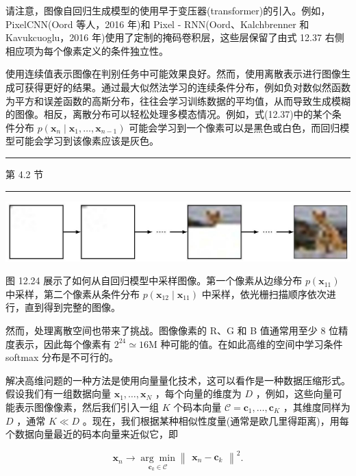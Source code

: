 \documentclass[10pt]{report}
\newcommand{\HRule}{\begin{center}\rule{0.9\linewidth}{0.2mm}\end{center}}
\begin{document}
请注意，图像自回归生成模型的使用早于变压器(transformer)的引入。例如，PixelCNN(Oord 等人，2016 年)和 Pixel - RNN(Oord、Kalchbrenner 和 Kavukcuoglu，2016 年)使用了定制的掩码卷积层，这些层保留了由式 12.37 右侧相应项为每个像素定义的条件独立性。

使用连续值表示图像在判别任务中可能效果良好。然而，使用离散表示进行图像生成可获得更好的结果。通过最大似然法学习的连续条件分布，例如负对数似然函数为平方和误差函数的高斯分布，往往会学习训练数据的平均值，从而导致生成模糊的图像。相反，离散分布可以轻松处理多模态情况。例如，式(12.37)中的某个条件分布 \(p\left( {{\mathbf{x}}_{n} \mid  {\mathbf{x}}_{1},\ldots ,{\mathbf{x}}_{n - 1}}\right)\) 可能会学习到一个像素可以是黑色或白色，而回归模型可能会学习到该像素应该是灰色。

\HRule

第 4.2 节

\HRule

\begin{center}
\includegraphics[max width=1.0\textwidth]{images/0194e279-9b28-703a-88f4-c3ac21e2010d_416_272_1666_1252_219_0.jpg}
\end{center}
\hspace*{3em} 

图 12.24 展示了如何从自回归模型中采样图像。第一个像素从边缘分布 \(p\left( {\mathbf{x}}_{11}\right)\) 中采样，第二个像素从条件分布 \(p\left( {{\mathbf{x}}_{12} \mid  {\mathbf{x}}_{11}}\right)\) 中采样，依光栅扫描顺序依次进行，直到得到完整的图像。

然而，处理离散空间也带来了挑战。图像像素的 R、G 和 B 值通常用至少 8 位精度表示，因此每个像素有 \({2}^{24} \simeq  {16}\mathrm{M}\) 种可能的值。在如此高维的空间中学习条件 softmax 分布是不可行的。

解决高维问题的一种方法是使用向量量化技术，这可以看作是一种数据压缩形式。假设我们有一组数据向量 \({\mathbf{x}}_{1},\ldots ,{\mathbf{x}}_{N}\) ，每个向量的维度为 \(D\) ，例如，这些向量可能表示图像像素，然后我们引入一组 \(K\) 个码本向量 \(\mathcal{C} = {\mathbf{c}}_{1},\ldots ,{\mathbf{c}}_{K}\) ，其维度同样为 \(D\) ，通常 \(K \ll  D\) 。现在，我们根据某种相似性度量(通常是欧几里得距离)，用每个数据向量最近的码本向量来近似它，即

\[
{\mathbf{x}}_{n} \rightarrow  \underset{{\mathbf{c}}_{k} \in  \mathcal{C}}{\arg \min }{\begin{Vmatrix}{\mathbf{x}}_{n} - {\mathbf{c}}_{k}\end{Vmatrix}}^{2}. \tag{12.38}
\]
\end{document}
